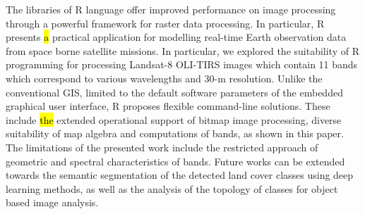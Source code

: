 \documentclass[applsci,article,submit,pdftex,moreauthors]{Definitions/mdpi}
\begin{document}
The libraries of R language offer improved performance on image processing through a powerful framework for raster data processing. In particular, R presents \hl{a }practical application for modelling real-time Earth observation data from space borne satellite missions. In particular, we \hl{ }explored the suitability of R programming for processing Landsat-8 OLI-TIRS images which contain 11 bands which correspond to various wavelengths and 30-m resolution. Unlike the conventional GIS, limited to the default software parameters of the embedded graphical user interface, R proposes flexible command-line solutions. These include \hl{the }extended operational support of bitmap image processing, diverse suitability of map algebra and computations of bands, as shown in this paper. The limitations of the presented work include the restricted approach of geometric and spectral characteristics of bands. Future works can be extended towards the semantic segmentation of the detected land cover classes using deep learning methods, as well as the analysis of the topology of classes for object based image analysis.








\end{document}
